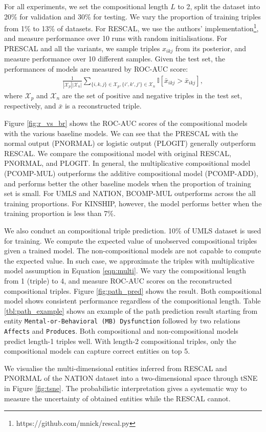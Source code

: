 For all experiments, we set the compositional length $L$ to 2, split the dataset into 20\% for validation and 30\% for testing. We vary the proportion of training triples
from 1\% to 13\% of datasets. For RESCAL, we use the authors' implementation\footnote{https://github.com/mnick/rescal.py}, and measure performance over 10 runs with random initialisations. For PRESCAL and all the variants, we sample triples $x_{ikj}$ from its posterior, and measure performance over 10 different samples.
Given the test set, the performances of models are measured by ROC-AUC score:
\begin{align}
\frac{1}{|\mathcal{X}_p|  |\mathcal{X}_n|} \sum_{\{i,k,j\} \in \mathcal{X}_p, \{i',k',j'\} \in \mathcal{X}_n} \mathbb{I}[\bar{x}_{ikj} > \bar{x}_{ikj}],
\end{align}
where $\mathcal{X}_p$ and $\mathcal{X}_n$ are the set of positive and negative triples in the test set, respectively, and $\bar{x}$ is a reconstructed triple.

Figure \ref{fig:r_vs_br} shows the ROC-AUC scores of the compositional models with the various baseline models. We can see that the PRESCAL with the normal output (PNORMAL) or logistic output (PLOGIT) generally outperform RESCAL. We compare the compositional model with original RESCAL, PNORMAL, and PLOGIT. In general, the multiplicative compositional model (PCOMP-MUL) outperforms the additive compositional model (PCOMP-ADD), and performs better the other baseline models when the proportion of training set is small. For UMLS and NATION, BCOMP-MUL outperforms across the all training proportions. For KINSHIP, however, the model performs better when the training proportion is less than 7\%.

We also conduct an compositional triple prediction. 10\% of UMLS dataset is used for training. We compute the expected value of unobserved compositional triples given a trained model. The non-compositional models are not capable to compute the expected value. In such case, we approximate the triples with multiplicative model assumption in Equation \ref{eqn:multi}. We vary the compositional length from 1 (triple) to 4, and measure ROC-AUC scores on the reconstructed compositional triples. Figure \ref{fig:path_pred} shows the result. Both compositional model shows consistent performance regardless of the compositional length. Table \ref{tbl:path_example} shows an example of the path prediction result starting from entity \texttt{Mental-or-Behavioral (MB) Dysfunction} followed by two relations \texttt{Affects} and \texttt{Produces}. Both compositional and non-compositional models predict length-1 triples well. With length-2 compositional triples, only the compositional models can capture correct entities on top 5.

We visualise the multi-dimensional entities inferred from RESCAL and PNORMAL of the NATION dataset into a two-dimensional space through tSNE \cite{VanDerMaaten2008} in Figure \ref{fig:tsne}. The probabilistic interpretation gives a systematic way to measure the uncertainty of obtained entities while the RESCAL cannot.
